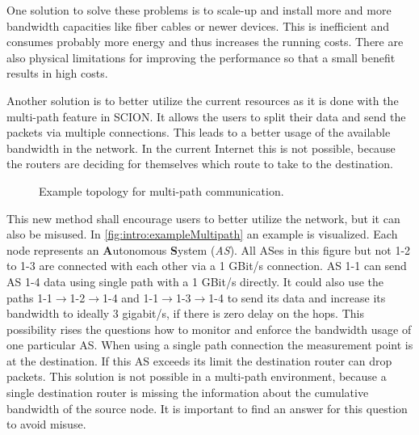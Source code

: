 \documentclass[thesis.tex]{subfiles}
\begin{document}
One solution to solve these problems is to scale-up and install more and more bandwidth capacities like fiber cables or newer devices. This is inefficient and consumes probably more energy and thus increases the running costs. There are also physical limitations for improving the performance so that a small benefit results in high costs.

Another solution is to better utilize the current resources as it is done with the multi-path feature in SCION. It allows the users to split their data and send the packets via multiple connections. This leads to a better usage of the available bandwidth in the network. In the current Internet this is not possible, because the routers are deciding for themselves which route to take to the destination. 

\begin{figure}[h]
    \centering
    \caption{Example topology for multi-path communication.}
    \label{fig:intro:exampleMultipath}
\end{figure}

This new method shall encourage users to better utilize the network, but it can also be misused. In \autoref{fig:intro:exampleMultipath} an example is visualized. Each node represents an \textbf{A}utonomous \textbf{S}ystem (\textit{AS}). All ASes in this figure but not 1-2 to 1-3 are connected with each other via a 1 GBit/s connection. AS 1-1 can send AS 1-4 data using single path with a 1 GBit/s directly. It could also use the paths 1-1$\rightarrow$1-2$\rightarrow$1-4 and 1-1$\rightarrow$1-3$\rightarrow$1-4 to send its data and increase its bandwidth to ideally 3 gigabit/s, if there is zero delay on the hops. This possibility rises the questions how to monitor and enforce the bandwidth usage of one particular AS. When using a single path connection the measurement point is at the destination. If this AS exceeds its limit the destination router can drop packets. This solution is not possible in a multi-path environment, because a single destination router is missing the information about the cumulative bandwidth of the source node. It is important to find an answer for this question to avoid misuse.
\end{document}
